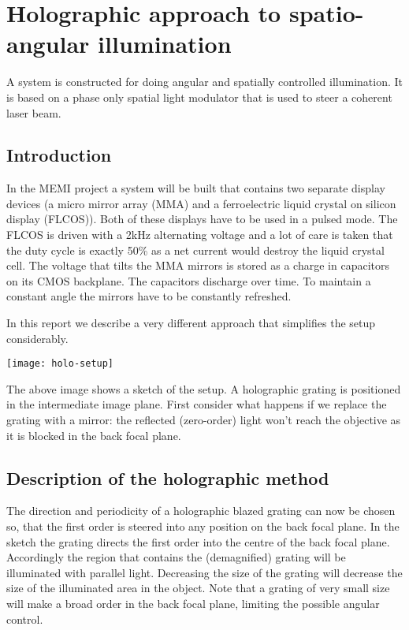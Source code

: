 \chapter{Holographic approach to spatio-angular illumination}


A system is constructed for doing angular and spatially controlled illumination. It is based on a phase only spatial light modulator that is used to steer a coherent laser beam.

\section{Introduction}
In the MEMI project a system will be built that contains two separate
display devices (a micro mirror array (MMA) and a ferroelectric liquid
crystal on silicon display (FLCOS)). Both of these displays have to be
used in a pulsed mode. The FLCOS is driven with a 2kHz alternating
voltage and a lot of care is taken that the duty cycle is exactly 50\%
as a net current would destroy the liquid crystal cell. The voltage
that tilts the MMA mirrors is stored as a charge in capacitors on its
CMOS backplane. The capacitors discharge over time. To maintain a
constant angle the mirrors have to be constantly refreshed.

In this report we describe a very different approach that simplifies
the setup considerably.

\texttt{[image: holo-setup]}

The above image shows a sketch of the setup. A holographic grating is
positioned in the intermediate image plane. First consider what
happens if we replace the grating with a mirror: the reflected
(zero-order) light won't reach the objective as it is blocked in the
back focal plane.

\section{Description of the holographic method}
The direction and periodicity of a holographic blazed grating can now
be chosen so, that the first order is steered into any position on the
back focal plane. In the sketch the grating directs the first order
into the centre of the back focal plane. Accordingly the region that
contains the (demagnified) grating will be illuminated with parallel
light. Decreasing the size of the grating will decrease the size of
the illuminated area in the object. Note that a grating of very small
size will make a broad order in the back focal plane, limiting the
possible angular control.
